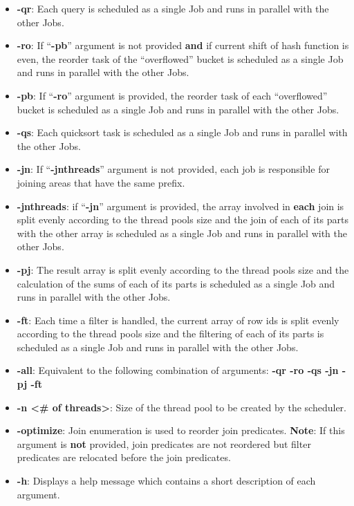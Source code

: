 \documentclass{ws-ijprai}
\begin{document}
\begin{itemize}
    \item \textbf{-qr}: Each query is scheduled as a single Job and runs in parallel with the other Jobs.
    \item \textbf{-ro}: If “\textbf{-pb}” argument is not provided \textbf{and} if current shift of hash function is even, the reorder task of the “overflowed” bucket is scheduled as a single Job and runs in parallel with the other Jobs.
    \item \textbf{-pb}: If “\textbf{-ro}” argument is provided, the reorder task of each “overflowed” bucket is scheduled as a single Job and runs in parallel with the other Jobs.
    \item \textbf{-qs}: Each quicksort task is scheduled as a single Job and runs in parallel with the other Jobs.
    \item \textbf{-jn}: If “\textbf{-jnthreads}” argument is not provided, each job is responsible for joining areas that have the same prefix.
    \item \textbf{-jnthreads}: if “\textbf{-jn}” argument is provided, the array involved in \textbf{each} join is split evenly according to the thread pool\textquotesingle s size and the join of each of its parts with the other array is scheduled as a single Job and runs in parallel with the other Jobs.
    \item \textbf{-pj}: The result array is split evenly according to the thread pool\textquotesingle s size and the calculation of the sums of each of its parts is scheduled as a single Job and runs in parallel with the other Jobs.
    \item \textbf{-ft}: Each time a filter is handled, the current array of row ids is split evenly according to the thread pool\textquotesingle s size and the filtering of each of its parts is scheduled as a single Job and runs in parallel with the other Jobs.
    \item \textbf{-all}: Equivalent to the following combination of arguments: \textbf{-qr -ro -qs -jn -pj -ft}
    \item \textbf{-n \textless \# of threads\textgreater}: Size of the thread pool to be created by the scheduler.
    \item \textbf{-optimize}: Join enumeration is used to reorder join predicates. \textbf{Note}: If this argument is \textbf{not} provided, join predicates are not reordered but filter predicates are relocated before the join predicates.
    \item \textbf{-h}: Displays a help message which contains a short description of each argument.
 \end{itemize}
 
\end{document}

